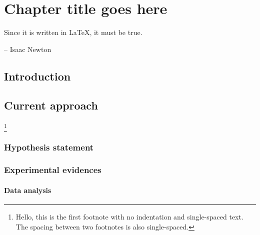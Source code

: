 \chapter{Chapter title goes here} \label{chap:chap-3}


\epigraph{Since it is written in \LaTeX, it must be true.}{-- Isaac Newton}





\section{Introduction}

\section{Current approach}
\footnote{Hello, this is the first footnote with no indentation and single-spaced text. The spacing between two footnotes is also single-spaced.}

\subsection{Hypothesis statement}


\subsection{Experimental evidences}


\subsubsection{Data analysis}

